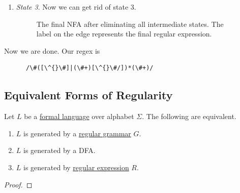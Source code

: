 \begin{example}
\begin{enumerate}
      \item \textit{State 3}. Now we can get rid of state 3. 

        \begin{figure}[H]
          \centering
          \caption{The final NFA after eliminating all intermediate states. The label on the edge represents the final regular expression.}
          \label{fig:final_regex}
        \end{figure}
    \end{enumerate}

    Now we are done. Our regex is 
    \begin{lstlisting}
      /\#([\^{}\#]|(\#+)[\^{}\#/])*(\#+)/ 
    \end{lstlisting}
  \end{example}

\subsection{Equivalent Forms of Regularity} 

	\begin{theorem}
		\label{thm:regular_equivalence}
	  Let $L$ be a \hyperref[def:formal-language]{formal language} over alphabet $\Sigma$. The following are equivalent. 
		\begin{enumerate}
		  \item $L$ is generated by a \hyperref[def:regular-grammar]{regular grammar} $G$. 
			\item $L$ is generated by a DFA. 
			\item $L$ is generated by \hyperref[def:regular_expression]{regular expression} $R$. 
		\end{enumerate}
	\end{theorem}
	\begin{proof}
	  
	\end{proof}

